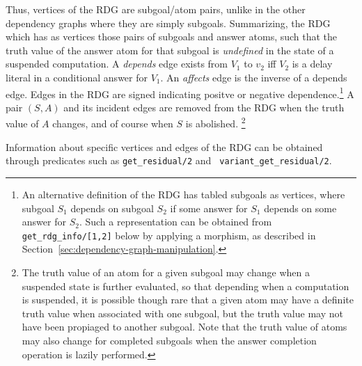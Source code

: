 Thus, vertices of the RDG are subgoal/atom pairs, unlike in the other
dependency graphs where they are simply subgoals.  Summarizing, the
RDG which has as vertices those pairs of subgoals and answer atoms,
such that the truth value of the answer atom for that subgoal is {\em
  undefined} in the state of a suspended computation.  A {\em depends}
edge exists from $V_1$ to $v_2$ iff $V_2$ is a delay literal in a
conditional answer for $V_1$.  An {\em affects} edge is the inverse of
a depends edge.  Edges in the RDG are signed indicating positve or
negative dependence.\footnote{An alternative definition of the RDG has
  tabled subgoals as vertices, where subgoal $S_1$ depends on subgoal
  $S_2$ if some answer for $S_1$ depends on some answer for $S_2$.
  Such a representation can be obtained from {\tt
    get\_rdg\_info/[1,2]} below by applying a morphism, as described
  in Section~\ref{sec:dependency-graph-manipulation}.}
%
  A pair $(S,A)$ and its incident edges are removed from the RDG when
  the truth value of $A$ changes, and of course when $S$ is abolished.
\footnote{The truth value of an atom for a given subgoal may change
  when a suspended state is further evaluated, so that depending when
  a computation is suspended, it is possible though rare that a given
  atom may have a definite truth value when associated with one
  subgoal, but the truth value may not have been propiaged to another
  subgoal.  Note that the truth value of atoms may also change for
  completed subgoals when the {\sc answer completion} operation is
  lazily performed.}

Information about specific vertices and edges of the RDG can be
obtained through predicates such as {\tt get\_residual/2} and {\tt
  variant\_get\_residual/2}.

